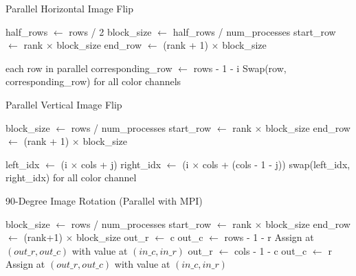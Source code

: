 \documentclass{article}
\begin{document}
\begin{algorithm}
	\caption{Parallel Horizontal Image Flip}
	\begin{algorithmic}[1]
		\State half\_rows $\gets$ rows / 2
		\State block\_size $\gets$ half\_rows / num\_processes
		\State start\_row $\gets$ rank $\times$ block\_size
		\State end\_row $\gets$ (rank + 1) $\times$ block\_size

		\For each row in parallel
		\State corresponding\_row $\gets$ rows - 1 - i
		\State Swap(row, corresponding\_row) for all color channels
		\EndFor
		\EndProcedure
	\end{algorithmic}
\end{algorithm}

\begin{algorithm}
	\caption{Parallel Vertical Image Flip}
	\begin{algorithmic}[1]
		\State block\_size $\gets$ rows / num\_processes
		\State start\_row $\gets$ rank $\times$ block\_size
		\State end\_row $\gets$ (rank + 1) $\times$ block\_size

		\State left\_idx $\gets$ (i $\times$ cols + j)
		\State right\_idx $\gets$ (i $\times$ cols + (cols - 1 - j))
		\State swap(left\_idx, right\_idx) for all color channel
		\EndFor
		\EndFor
		\EndProcedure
	\end{algorithmic}
\end{algorithm}

\begin{algorithm}
\caption{90-Degree Image Rotation (Parallel with MPI)}
\begin{algorithmic}[1]
\State block\_size $\gets$ rows / num\_processes
\State start\_row $\gets$ rank $\times$ block\_size
\State end\_row $\gets$ (rank+1) $\times$ block\_size
                \State out\_r $\gets$ c
                \State out\_c $\gets$ rows - 1 - r
                \State Assign at $(out\_r, out\_c)$ with value at $(in\_c, in\_r)$
        \EndFor
    \EndFor
\Else {}
                \State out\_r $\gets$ cols - 1 - c
                \State out\_c $\gets$ r
                \State Assign at $(out\_r, out\_c)$ with value at $(in\_c, in\_r)$
        \EndFor
    \EndFor
\EndIf
\EndProcedure
\end{algorithmic}
\end{algorithm}
\end{document}
